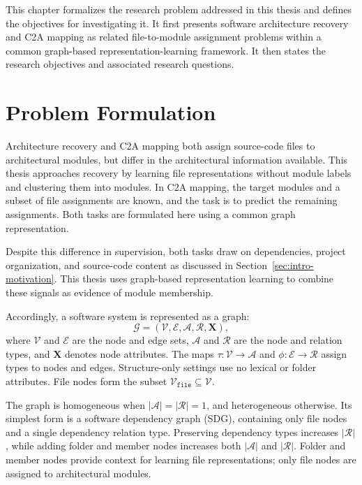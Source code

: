 This chapter formalizes the research problem addressed in this thesis and defines the objectives for investigating it. It first presents software architecture recovery and C2A mapping as related file-to-module assignment problems within a common graph-based representation-learning framework. It then states the research objectives and associated research questions.

\section{Problem Formulation}
\label{sec:problem-formulation}
Architecture recovery and C2A mapping both assign source-code files to architectural modules, but differ in the architectural information available. This thesis approaches recovery by learning file representations without module labels and clustering them into modules. In C2A mapping, the target modules and a subset of file assignments are known, and the task is to predict the remaining assignments. Both tasks are formulated here using a common graph representation.

Despite this difference in supervision, both tasks draw on dependencies, project organization, and source-code content as discussed in Section~\ref{sec:intro-motivation}. This thesis uses graph-based representation learning to combine these signals as evidence of module membership.

Accordingly, a software system is represented as a graph:
\begin{equation}
\mathcal{G} = (\mathcal{V}, \mathcal{E}, \mathcal{A}, \mathcal{R}, \mathbf{X}),
\label{eq:software_graph}
\end{equation}
where $\mathcal{V}$ and $\mathcal{E}$ are the node and edge sets, $\mathcal{A}$ and $\mathcal{R}$ are the node and relation types, and $\mathbf{X}$ denotes node attributes. The maps $\tau: \mathcal{V} \rightarrow \mathcal{A}$ and $\phi: \mathcal{E} \rightarrow \mathcal{R}$ assign types to nodes and edges. Structure-only settings use no lexical or folder attributes. File nodes form the subset $\mathcal{V}_{\texttt{file}} \subseteq \mathcal{V}$.

The graph is homogeneous when $|\mathcal{A}| = |\mathcal{R}| = 1$, and heterogeneous otherwise. Its simplest form is a software dependency graph (SDG), containing only file nodes and a single dependency relation type. Preserving dependency types increases $|\mathcal{R}|$, while adding folder and member nodes increases both $|\mathcal{A}|$ and $|\mathcal{R}|$. Folder and member nodes provide context for learning file representations; only file nodes are assigned to architectural modules.

